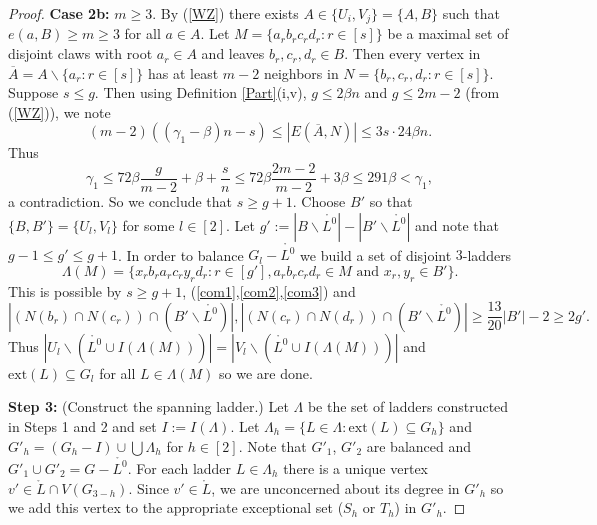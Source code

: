 \documentclass[oneside,12pt]{memoir}
\newcommand{\g}{\gamma}
\newcommand{\ssm}{\smallsetminus}
\begin{document}
\begin{proof}
\noindent\textbf{Case 2b:} $m\ge 3$. By (\ref{WZ}) there exists $A\in\{U_i,V_j\}=\{A,B\}$ such that $e(a,B)\ge m\ge 3$ for all $a\in A$.  Let $M=\{a_rb_rc_rd_r:r\in [s]\}$ be a maximal set of disjoint claws with root $a_r\in A$ and leaves $b_r,c_r,d_r\in B$. Then every vertex in $\overline A=A\ssm \{a_r:r\in[s]\}$ has at least $m-2$ neighbors in $N=\{b_r,c_r,d_r:r\in [s]\}$. Suppose $s\le g$. Then using Definition \ref{Part}(i,v), $g\le2\beta n$ and $g\leq 2m-2$ (from (\ref{WZ})), we note
\[
(m-2)((\g_1-\beta)n-s)\le |E(\overline{A},N)|\le 3s\cdot 24\beta n.
\]
Thus 
\begin{equation}
\g_1\le 72\beta\frac{g}{m-2}+\beta+\frac{s}{n}\leq 72\beta\frac{2m-2}{m-2}+3\beta\le291\beta<\gamma_1, \label{*}
\end{equation}
a contradiction.  So we conclude that $s\ge g+1$. Choose $B'$ so that $\{B,B'\}=\{U_l,V_l\}$ for some $l\in[2]$.  Let $g':=|B\ssm \mathring{L^0}| -|B'\ssm \mathring{L^0}|$ and note that $g-1\le g'\le g+1$.  
In order to balance $G_l-\mathring{L^0}$ we build a set of disjoint $3$-ladders $$\Lambda(M)=\{x_rb_ra_rc_ry_rd_r:r\in[g'], a_rb_rc_rd_r\in M \text{ and } x_r,y_r\in B'\}.$$  
This is possible by $s\geq g+1$, (\ref{com1},\ref{com2},\ref{com3}) and 
$$|(N(b_r)\cap N(c_r))\cap (B'\ssm \mathring{L^0})|, |(N(c_r)\cap N(d_r))\cap (B'\ssm \mathring{L^0})|\ge \frac{13}{20}|B'|-2\ge 2g'.$$ 
Thus $|U_l\ssm (\mathring{L^0}\cup I(\Lambda(M)))|=|V_l\ssm (\mathring{L^0}\cup I(\Lambda(M)))|$ and $\mathrm{ext}(L)\subseteq G_l$ for all $L\in \Lambda(M)$ so we are done.

\noindent\textbf{Step 3:} (Construct the spanning ladder.) Let $\Lambda$ be the set of ladders constructed in Steps 1 and 2 and set $I:=I(\Lambda)$. Let $\Lambda_{h}=\{L\in \Lambda: \mathrm{ext}(L)\subseteq G_{h}\}$ and $G'_{h}=(G_{h}-I)\cup\bigcup \Lambda_{h}$ for $h\in[2]$. Note that $G'_1$, $G'_2$ are balanced and $G'_1\cup G'_2=G-\mathring{L^0}$.
For each ladder $L\in \Lambda_{h}$ there is a unique vertex $v'\in \mathring{L}\cap V(G_{3-h})$. Since $v'\in\mathring{L}$, we are unconcerned about its degree in $G'_{h}$ so we add this vertex to the appropriate exceptional set ($S_h$ or $T_h$) in $G'_h$.


\end{proof}
\end{document}
